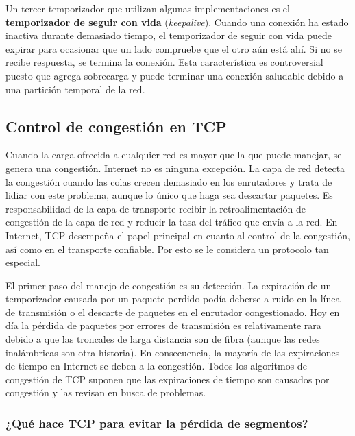 \documentclass[10pt,a4paper]{report}
\begin{document}
	\par Un tercer temporizador que utilizan algunas implementaciones es el \textbf{temporizador de seguir con vida} (\textit{keepalive}). Cuando una conexión ha estado inactiva durante demasiado tiempo, el temporizador de seguir con vida puede expirar para ocasionar que un lado compruebe que el otro aún está ahí. Si no se recibe respuesta, se termina la conexión. Esta característica es controversial puesto que agrega sobrecarga y puede terminar una conexión saludable debido a una partición temporal de la red.

\subsection{Control de congestión en TCP}

	\par Cuando la carga ofrecida a cualquier red es mayor que la que puede manejar, se genera una congestión. Internet no es ninguna excepción. La capa de red detecta la congestión cuando las colas crecen demasiado en los enrutadores y trata de lidiar con este problema, aunque lo único que haga sea descartar paquetes. Es responsabilidad de la capa de transporte recibir la retroalimentación de congestión de la capa de red y reducir la tasa del tráfico que envía a la red. En Internet, TCP desempeña el papel principal en cuanto al control de la congestión, así como en el transporte confiable. Por esto se le considera un protocolo tan especial.
	
	\par El primer paso del manejo de congestión es su detección. La expiración de un temporizador causada por un paquete perdido podía deberse a ruido en la línea de transmisión o el descarte de paquetes en el enrutador congestionado.  Hoy en día la pérdida de paquetes por errores de transmisión es relativamente rara debido a que las troncales de larga distancia son de fibra (aunque las redes inalámbricas son otra historia). En consecuencia, la mayoría de las expiraciones de tiempo en Internet se deben a la congestión. Todos los algoritmos de congestión de TCP suponen que las expiraciones de tiempo son causados por congestión y las revisan en busca de problemas.
	
\subsubsection{¿Qué hace TCP para evitar la pérdida de segmentos?}
\end{document}
